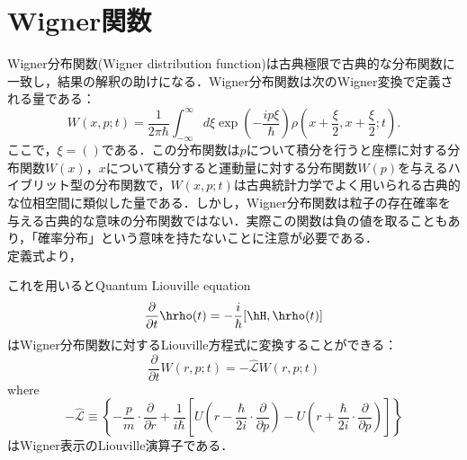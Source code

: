 
\section{Wigner関数}
Wigner分布関数(Wigner distribution function)は古典極限で古典的な分布関数に一致し，結果の解釈の助けになる．Wigner分布関数は次のWigner変換で定義される量である：
\begin{equation}
    W(x,p;t) = \frac{1}{2\pi\hbar}\int_{-\infty}^{\infty}d\xi \exp{\left(-\frac{ip\xi}{\hbar}\right)}
    \rho\left(x+\frac{\xi}{2}, x+\frac{\xi}{2};t\right).
\end{equation}
ここで，$\xi=()$である．この分布関数は$p$について積分を行うと座標に対する分布関数$W(x)$，$x$について積分すると運動量に対する分布関数$W(p)$を与えるハイブリット型の分布関数で，$W(x,p;t)$は古典統計力学でよく用いられる古典的な位相空間に類似した量である．しかし，Wigner分布関数は粒子の存在確率を与える古典的な意味の分布関数ではない．実際この関数は負の値を取ることもあり，「確率分布」という意味を持たないことに注意が必要である．\\
定義式より，

これを用いるとQuantum Liouville equation
\begin{equation}
    \frac{\partial}{\partial t}\hrho(t) =-\frac{i}{\hbar}[\hH, \hrho(t)]
\end{equation}
はWigner分布関数に対するLiouville方程式に変換することができる：
\begin{equation}
    \frac{\partial}{\partial t}W(r,p;t) =-\hat{\mathcal{L}}W(r,p;t)
\end{equation}
where
\begin{equation}
    -\hat{\mathcal{L}}\equiv
    \left\{
    -\frac{p}{m}\cdot\frac{\partial}{\partial r}
    +\frac{1}{i\hbar}\left[U\left(r-\frac{\hbar}{2i}\cdot\frac{\partial}{\partial p}\right)
    -U\left(r+\frac{\hbar}{2i}\cdot\frac{\partial}{\partial p}\right)
    \right]
    \right\}
\end{equation}
はWigner表示のLiouville演算子である．



